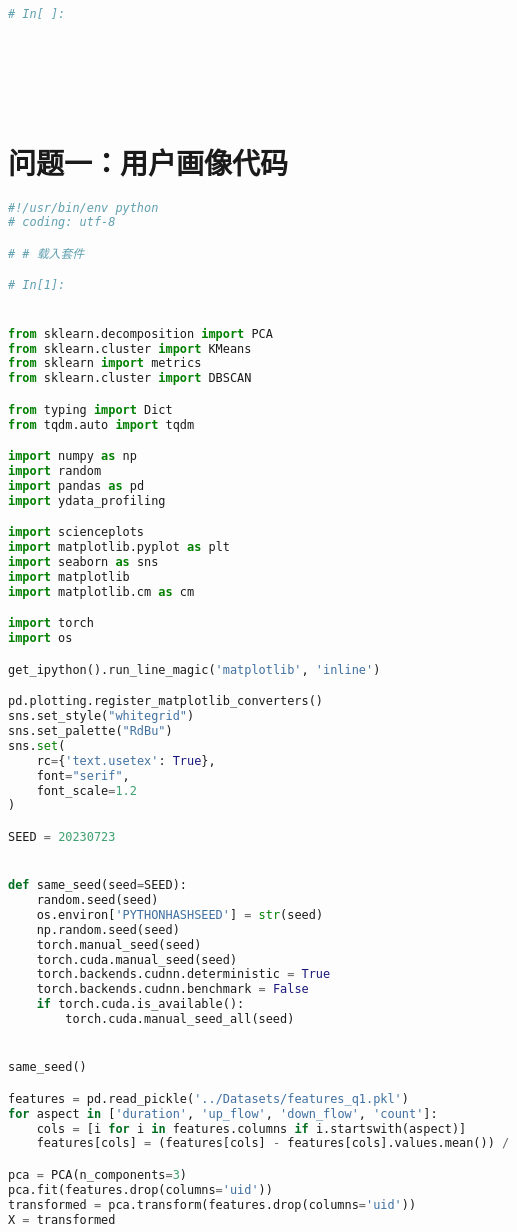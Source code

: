 \documentclass[withoutpreface,bwprint]{cumcmthesis}
\begin{document}
\begin{appendices}
\begin{lstlisting}[language=Python]
# In[ ]:




        
    \end{lstlisting}

    \section{问题一：用户画像代码}

    \begin{lstlisting}[language=Python]
#!/usr/bin/env python
# coding: utf-8

# # 载入套件

# In[1]:


from sklearn.decomposition import PCA
from sklearn.cluster import KMeans
from sklearn import metrics
from sklearn.cluster import DBSCAN

from typing import Dict
from tqdm.auto import tqdm

import numpy as np
import random
import pandas as pd
import ydata_profiling

import scienceplots
import matplotlib.pyplot as plt
import seaborn as sns
import matplotlib
import matplotlib.cm as cm

import torch
import os

get_ipython().run_line_magic('matplotlib', 'inline')

pd.plotting.register_matplotlib_converters()
sns.set_style("whitegrid")
sns.set_palette("RdBu")
sns.set(
    rc={'text.usetex': True},
    font="serif",
    font_scale=1.2
)

SEED = 20230723


def same_seed(seed=SEED):
    random.seed(seed)
    os.environ['PYTHONHASHSEED'] = str(seed)
    np.random.seed(seed)
    torch.manual_seed(seed)
    torch.cuda.manual_seed(seed)
    torch.backends.cudnn.deterministic = True
    torch.backends.cudnn.benchmark = False
    if torch.cuda.is_available():
        torch.cuda.manual_seed_all(seed)


same_seed()

features = pd.read_pickle('../Datasets/features_q1.pkl')
for aspect in ['duration', 'up_flow', 'down_flow', 'count']:
    cols = [i for i in features.columns if i.startswith(aspect)]
    features[cols] = (features[cols] - features[cols].values.mean()) /         features[cols].values.std()

pca = PCA(n_components=3)
pca.fit(features.drop(columns='uid'))
transformed = pca.transform(features.drop(columns='uid'))
X = transformed


\end{lstlisting}
\end{appendices}
\end{document}
